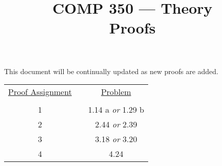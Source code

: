 \documentclass[nobib]{tufte-handout}
\title{COMP 350 --- Theory \\ Proofs}
\begin{document}
\maketitle

This document will be continually updated as new proofs are added.

\begin{center}
\begin{tabular}{ccc}
  \underline{Proof Assignment} & \hspace{.5in} &  \underline{Problem} \\ \\
  1 & & 1.14 a \textit{or} 1.29 b \\
  2 & & 2.44 \textit{or} 2.39 \\
  3 & & 3.18 \textit{or} 3.20 \\
  4 & & 4.24 \\
\end{tabular}
\end{center}
\end{document}
